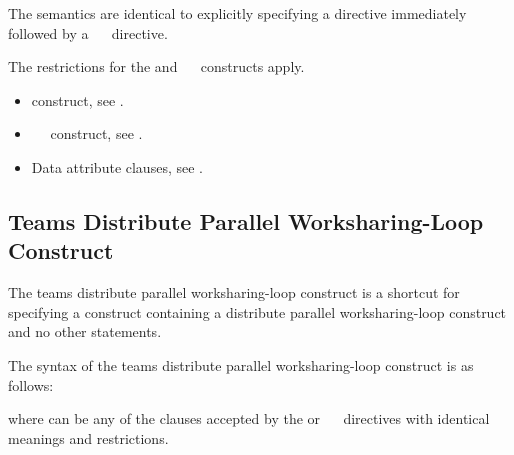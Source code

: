 \descr
The semantics are identical to explicitly specifying a  directive immediately
followed by a ~~ directive.

\restrictions
The restrictions for the  and ~~ constructs apply.

\crossreferences
\begin{itemize}
\item {} construct, see
.

\item {}~~ construct, see
.

\item Data attribute clauses, see
.
\end{itemize}











\subsection{Teams Distribute Parallel Worksharing-Loop Construct}
\label{subsec:Teams Distribute Parallel Worksharing-Loop Construct}
\summary
The teams distribute parallel worksharing-loop construct is a shortcut for specifying a 
construct containing a distribute parallel worksharing-loop construct and no other statements.

\syntax
\begin{ccppspecific}
The syntax of the teams distribute parallel worksharing-loop construct is as follows:

\begin{ompcPragma}[fontsize=\small]
#pragma omp teams distribute parallel for \plc{\}
            \plc{[clause[ [},\plc{] clause] ...  ] new-line}
    \plc{for-loops}
\end{ompcPragma}

where  can be any of the clauses accepted by the  or
~~ directives with identical meanings and restrictions.
\end{ccppspecific}

